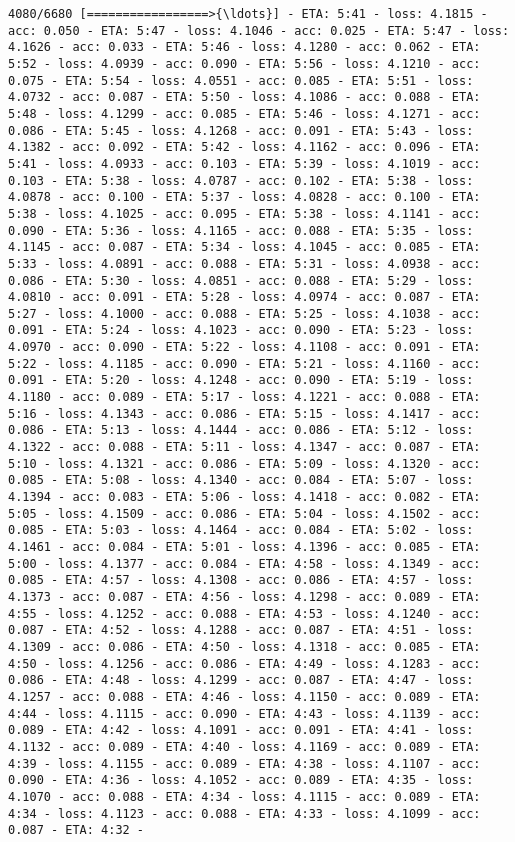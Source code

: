 \documentclass[11pt]{article}
\begin{document}
\begin{Verbatim}[commandchars=\\\{\}]
4080/6680 [=================>{\ldots}] - ETA: 5:41 - loss: 4.1815 - acc: 0.050 - ETA: 5:47 - loss: 4.1046 - acc: 0.025 - ETA: 5:47 - loss: 4.1626 - acc: 0.033 - ETA: 5:46 - loss: 4.1280 - acc: 0.062 - ETA: 5:52 - loss: 4.0939 - acc: 0.090 - ETA: 5:56 - loss: 4.1210 - acc: 0.075 - ETA: 5:54 - loss: 4.0551 - acc: 0.085 - ETA: 5:51 - loss: 4.0732 - acc: 0.087 - ETA: 5:50 - loss: 4.1086 - acc: 0.088 - ETA: 5:48 - loss: 4.1299 - acc: 0.085 - ETA: 5:46 - loss: 4.1271 - acc: 0.086 - ETA: 5:45 - loss: 4.1268 - acc: 0.091 - ETA: 5:43 - loss: 4.1382 - acc: 0.092 - ETA: 5:42 - loss: 4.1162 - acc: 0.096 - ETA: 5:41 - loss: 4.0933 - acc: 0.103 - ETA: 5:39 - loss: 4.1019 - acc: 0.103 - ETA: 5:38 - loss: 4.0787 - acc: 0.102 - ETA: 5:38 - loss: 4.0878 - acc: 0.100 - ETA: 5:37 - loss: 4.0828 - acc: 0.100 - ETA: 5:38 - loss: 4.1025 - acc: 0.095 - ETA: 5:38 - loss: 4.1141 - acc: 0.090 - ETA: 5:36 - loss: 4.1165 - acc: 0.088 - ETA: 5:35 - loss: 4.1145 - acc: 0.087 - ETA: 5:34 - loss: 4.1045 - acc: 0.085 - ETA: 5:33 - loss: 4.0891 - acc: 0.088 - ETA: 5:31 - loss: 4.0938 - acc: 0.086 - ETA: 5:30 - loss: 4.0851 - acc: 0.088 - ETA: 5:29 - loss: 4.0810 - acc: 0.091 - ETA: 5:28 - loss: 4.0974 - acc: 0.087 - ETA: 5:27 - loss: 4.1000 - acc: 0.088 - ETA: 5:25 - loss: 4.1038 - acc: 0.091 - ETA: 5:24 - loss: 4.1023 - acc: 0.090 - ETA: 5:23 - loss: 4.0970 - acc: 0.090 - ETA: 5:22 - loss: 4.1108 - acc: 0.091 - ETA: 5:22 - loss: 4.1185 - acc: 0.090 - ETA: 5:21 - loss: 4.1160 - acc: 0.091 - ETA: 5:20 - loss: 4.1248 - acc: 0.090 - ETA: 5:19 - loss: 4.1180 - acc: 0.089 - ETA: 5:17 - loss: 4.1221 - acc: 0.088 - ETA: 5:16 - loss: 4.1343 - acc: 0.086 - ETA: 5:15 - loss: 4.1417 - acc: 0.086 - ETA: 5:13 - loss: 4.1444 - acc: 0.086 - ETA: 5:12 - loss: 4.1322 - acc: 0.088 - ETA: 5:11 - loss: 4.1347 - acc: 0.087 - ETA: 5:10 - loss: 4.1321 - acc: 0.086 - ETA: 5:09 - loss: 4.1320 - acc: 0.085 - ETA: 5:08 - loss: 4.1340 - acc: 0.084 - ETA: 5:07 - loss: 4.1394 - acc: 0.083 - ETA: 5:06 - loss: 4.1418 - acc: 0.082 - ETA: 5:05 - loss: 4.1509 - acc: 0.086 - ETA: 5:04 - loss: 4.1502 - acc: 0.085 - ETA: 5:03 - loss: 4.1464 - acc: 0.084 - ETA: 5:02 - loss: 4.1461 - acc: 0.084 - ETA: 5:01 - loss: 4.1396 - acc: 0.085 - ETA: 5:00 - loss: 4.1377 - acc: 0.084 - ETA: 4:58 - loss: 4.1349 - acc: 0.085 - ETA: 4:57 - loss: 4.1308 - acc: 0.086 - ETA: 4:57 - loss: 4.1373 - acc: 0.087 - ETA: 4:56 - loss: 4.1298 - acc: 0.089 - ETA: 4:55 - loss: 4.1252 - acc: 0.088 - ETA: 4:53 - loss: 4.1240 - acc: 0.087 - ETA: 4:52 - loss: 4.1288 - acc: 0.087 - ETA: 4:51 - loss: 4.1309 - acc: 0.086 - ETA: 4:50 - loss: 4.1318 - acc: 0.085 - ETA: 4:50 - loss: 4.1256 - acc: 0.086 - ETA: 4:49 - loss: 4.1283 - acc: 0.086 - ETA: 4:48 - loss: 4.1299 - acc: 0.087 - ETA: 4:47 - loss: 4.1257 - acc: 0.088 - ETA: 4:46 - loss: 4.1150 - acc: 0.089 - ETA: 4:44 - loss: 4.1115 - acc: 0.090 - ETA: 4:43 - loss: 4.1139 - acc: 0.089 - ETA: 4:42 - loss: 4.1091 - acc: 0.091 - ETA: 4:41 - loss: 4.1132 - acc: 0.089 - ETA: 4:40 - loss: 4.1169 - acc: 0.089 - ETA: 4:39 - loss: 4.1155 - acc: 0.089 - ETA: 4:38 - loss: 4.1107 - acc: 0.090 - ETA: 4:36 - loss: 4.1052 - acc: 0.089 - ETA: 4:35 - loss: 4.1070 - acc: 0.088 - ETA: 4:34 - loss: 4.1115 - acc: 0.089 - ETA: 4:34 - loss: 4.1123 - acc: 0.088 - ETA: 4:33 - loss: 4.1099 - acc: 0.087 - ETA: 4:32 - 
\end{Verbatim}
\end{document}
